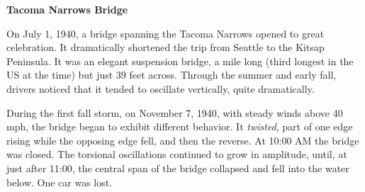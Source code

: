 \documentclass{article}
\theoremstyle{definition}
\begin{document}
\thispagestyle{empty}

\begin{center}{\bf Tacoma Narrows Bridge}\end{center}

On July 1, 1940, a bridge spanning the Tacoma Narrows opened
to great celebration. It dramatically shortened the trip from Seattle
to the Kitsap Peninsula. It was an elegant suspension bridge, a mile
long (third longest in the US at the time) but just 39 feet across.
Through the summer and early fall, drivers noticed that it tended to
oscillate vertically, quite dramatically. 

During the first fall storm, on November 7, 1940, with steady winds
above 40 mph, the bridge began to exhibit different behavior. It
{\it twisted}, part of one edge rising while the opposing edge fell, and then
the reverse. At 10:00 AM the bridge was closed. The torsional oscillations continued to grow in amplitude, until, at just after 11:00, the
central span of the bridge collapsed and fell into the water below. One
car was lost.
\end{document}
